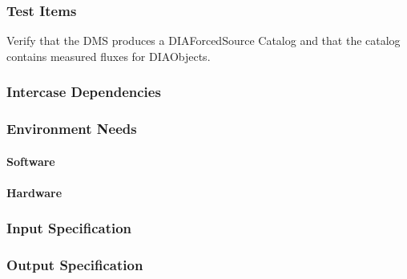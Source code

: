 \subsubsection{Test Items}
Verify that the DMS produces a DIAForcedSource Catalog and that the
catalog contains measured fluxes for DIAObjects.



\subsubsection{Intercase Dependencies}

\subsubsection{Environment Needs}

\paragraph{Software}

\paragraph{Hardware}

\subsubsection{Input Specification}

\subsubsection{Output Specification}

